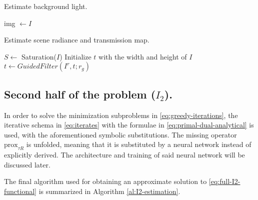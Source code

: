 \documentclass[twocolumn,twoside,a4paper,10pt]{IEEEtran}
\begin{document}
\begin{algorithm}\label{al:background-light}
\caption{Estimate background light.}

img \(\gets I\)\;
\end{algorithm}

\begin{algorithm}\label{al:I1}
\caption{Estimate scene radiance and transmission map.}

\(S\gets \) Saturation(\(I\))\;
Initialize \(t\) with the width and height of \(I\)\;
\(t \gets GuidedFilter(I^r, t; r_g)\)\;

\end{algorithm}

\subsection{Second half of the problem (\(I_2\)).}
In order to solve the minimization subproblems in \cref{eq:greedy-iterations}, the iterative schema in \cref{eq:iterates} with the formulae in \cref{eq:primal-dual-analytical} is used, with the aforementioned symbolic substitutions. The missing operator \(\text{prox}_{\tau R}\) is unfolded, meaning that it is substituted by a neural network instead of explicitly derived. The architecture and training of said neural network will be discussed later.

The final algorithm used for obtaining an approximate solution to \cref{eq:full-I2-functional} is summarized in Algorithm \ref{al:I2-estimation}.
\end{document}

